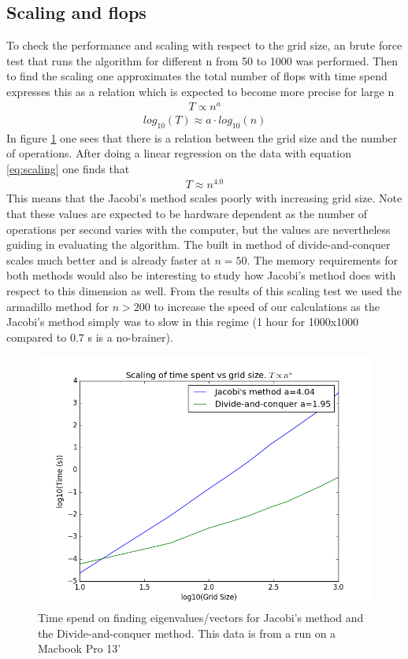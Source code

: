 \documentclass[a4paper,11pt]{article}
\begin{document}
{\begin{figure}
\end{figure}


\subsection{Scaling and flops}
To check the performance and scaling with respect to the grid size, an brute force test that runs the algorithm for different n from 50 to 1000 was performed. Then to find the scaling one approximates the total number of flops with time spend expresses this as a relation which is expected to become more precise for large n
\begin{align}
	T \propto n^{a} 
\end{align}
\begin{align}
	log_{10}(T) \approx a\cdot log_{10}(n)
	\label{eq:scaling}
\end{align}
In figure \ref{fig:scaling} one sees that there is a relation between the grid size and the number of operations. After doing a linear regression on the data with equation \ref{eq:scaling} one finds that 
\begin{align}
	T \approx n^{4.0}
\end{align}
This means that the Jacobi's method scales poorly with increasing grid size. Note that these values are expected to be hardware dependent as the number of operations per second varies with the computer, but the values are nevertheless guiding in evaluating the algorithm. The built in method of divide-and-conquer scales much better and is already faster at $n=50$. The memory requirements for both methods would also be interesting to study how Jacobi's method does with respect to this dimension as well. From the results of this scaling test we used the armadillo method for $n>200$ to increase the speed of our calculations as the Jacobi's method simply was to slow in this regime (1 hour for 1000x1000 compared to 0.7 s is a no-brainer). 
\begin{figure}
	\centering
	\includegraphics[scale=0.5]{Project2_scaling_time}
	\caption{Time spend on finding eigenvalues/vectors for Jacobi's method and the Divide-and-conquer method.  This data is from a run on a Macbook Pro 13' }
	\label{fig:scaling}
\end{figure}




}
\end{document}
